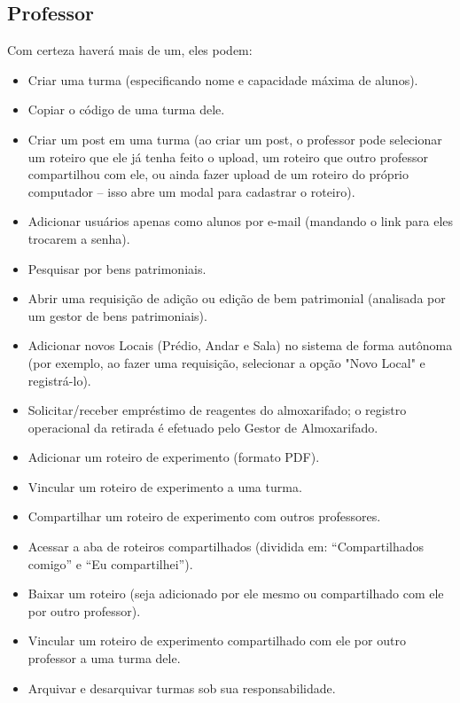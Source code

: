 \subsection{Professor}
Com certeza haverá mais de um, eles podem:
\begin{itemize}
    \item Criar uma turma (especificando nome e capacidade máxima de alunos).
    \item Copiar o código de uma turma dele.
    \item Criar um post em uma turma (ao criar um post, o professor pode selecionar um roteiro que ele já tenha feito o upload, um roteiro que outro professor compartilhou com ele, ou ainda fazer upload de um roteiro do próprio computador -- isso abre um modal para cadastrar o roteiro).
    \item Adicionar usuários apenas como alunos por e-mail (mandando o link para eles trocarem a senha).
    \item Pesquisar por bens patrimoniais.
    \item Abrir uma requisição de adição ou edição de bem patrimonial (analisada por um gestor de bens patrimoniais).
    \item Adicionar novos Locais (Prédio, Andar e Sala) no sistema de forma autônoma (por exemplo, ao fazer uma requisição, selecionar a opção "Novo Local" e registrá-lo).
    \item Solicitar/receber empréstimo de reagentes do almoxarifado; o registro operacional da retirada é efetuado pelo Gestor de Almoxarifado.
    \item Adicionar um roteiro de experimento (formato PDF).
    \item Vincular um roteiro de experimento a uma turma.
    \item Compartilhar um roteiro de experimento com outros professores.
    \item Acessar a aba de roteiros compartilhados (dividida em: ``Compartilhados comigo'' e ``Eu compartilhei'').
    \item Baixar um roteiro (seja adicionado por ele mesmo ou compartilhado com ele por outro professor).
    \item Vincular um roteiro de experimento compartilhado com ele por outro professor a uma turma dele.
    \item Arquivar e desarquivar turmas sob sua responsabilidade.
\end{itemize}

